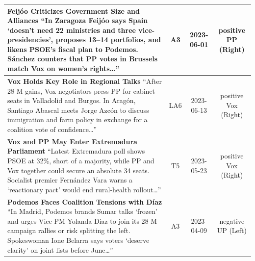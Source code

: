 \documentclass[12pt]{article}
\begin{document}
\begin{longtable}{|p{8cm}|c|c|c|}
	\hline
	\textbf{Feijóo Criticizes Government Size and Alliances}\newline
	{\scriptsize
		“In Zaragoza Feijóo says Spain ‘doesn’t need 22 ministries and three vice-presidencies’, proposes 13–14 portfolios, and likens PSOE’s fiscal plan to Podemos.  
		Sánchez counters that PP votes in Brussels match Vox on women’s rights…”}
	& A3 & 2023-06-01 & positive PP (Right)\\
	\hline
	\textbf{Vox Holds Key Role in Regional Talks}\newline
	{\scriptsize
		“After 28-M gains, Vox negotiators press PP for cabinet seats in Valladolid and Burgos.  
		In Aragón, Santiago Abascal meets Jorge Azcón to discuss immigration and farm policy in exchange for a coalition vote of confidence…”}
	& LA6 & 2023-06-13 & positive Vox (Right)\\
	\hline
	\textbf{Vox and PP May Enter Extremadura Parliament}\newline
	{\scriptsize
		“Latest Extremadura poll shows PSOE at 32\%, short of a majority, while PP and Vox together could secure an absolute 34 seats.  
		Socialist premier Fernández Vara warns a ‘reactionary pact’ would end rural-health rollout…”}
	& T5 & 2023-05-23 & positive Vox (Right)\\
	\hline
	\textbf{Podemos Faces Coalition Tensions with Díaz}\newline
	{\scriptsize
		“In Madrid, Podemos brands Sumar talks ‘frozen’ and urges Vice-PM Yolanda Díaz to join its 28-M campaign rallies or risk splitting the left.  
		Spokeswoman Ione Belarra says voters ‘deserve clarity’ on joint lists before June…”}
	& A3 & 2023-04-09 & negative UP (Left)\\

\end{longtable}
\end{document}
